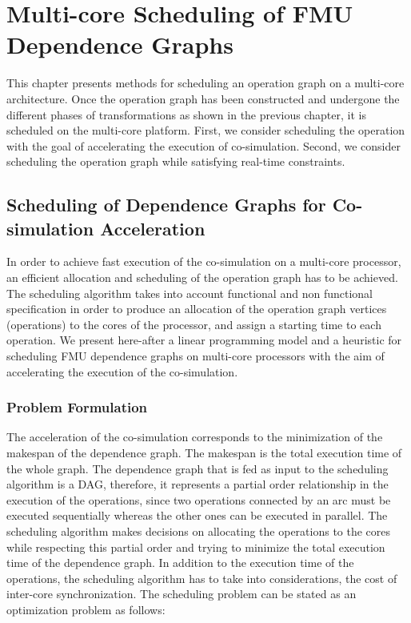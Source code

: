 \chapter{\label{ch:5-sched}Multi-core Scheduling of FMU Dependence Graphs} 

\minitoc

This chapter presents methods for scheduling an operation graph on a multi-core architecture. Once the operation graph has been constructed and undergone the different phases of transformations as shown in the previous chapter, it is scheduled on the multi-core platform. First, we consider scheduling the operation with the goal of accelerating the execution of co-simulation. Second, we consider scheduling the operation graph while satisfying real-time constraints.  

\section{Scheduling of Dependence Graphs for Co-simulation Acceleration}

In order to achieve fast execution of the co-simulation on a multi-core processor, an efficient allocation and scheduling of the operation graph has to be achieved. The scheduling algorithm takes into account functional and non functional specification in order to produce an allocation of the operation graph vertices (operations) to the cores of the processor, and assign a starting time to each operation. We present here-after a linear programming model and a heuristic for scheduling FMU dependence graphs on multi-core processors with the aim of accelerating the execution of the co-simulation.

\subsection{\label{5:shed-prob}Problem Formulation}

The acceleration of the co-simulation corresponds to the minimization of the makespan of the dependence graph. The makespan is the total execution time of the whole graph. The dependence graph that is fed as input to the scheduling algorithm is a DAG, therefore, it represents a partial order relationship in the execution of the operations, since two operations connected by an arc must be executed sequentially whereas the other ones can be executed in parallel. The scheduling algorithm makes decisions on allocating the operations to the cores while respecting this partial order and trying to minimize the total execution time of the dependence graph. In addition to the execution time of the operations, the scheduling algorithm has to take into considerations, the cost of inter-core synchronization. The scheduling problem can be stated as an optimization problem as follows:

